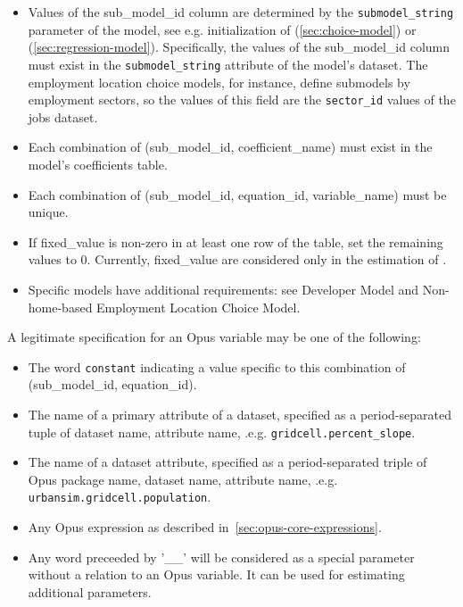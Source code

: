 \begin{itemize} \tight
\item Values of the sub_model_id column are
determined by the \verb|submodel_string| parameter of the model, see e.g. initialization of  
(\ref{sec:choice-model})
or  (\ref{sec:regression-model}). Specifically, the values of the sub_model_id column must 
exist in the \verb|submodel_string| attribute of the model's dataset.
The employment location choice models, for instance, define submodels by
employment sectors, so the values of this field are the
\verb|sector_id| values
of the jobs dataset. 
\item Each combination of (sub_model_id, coefficient_name) \coefficientsindex
must exist in the model's coefficients table.
\item Each combination of (sub_model_id, equation_id, variable_name) \variablesindex must be unique.
\item If fixed_value is non-zero in at least one row of the table, set the remaining values to 0. Currently, fixed_value 
are considered only in the estimation of .
\item Specific models \modelsindex have additional requirements: see Developer Model \modelsindex and Non-home-based Employment Location Choice Model. \modelsindex
\end{itemize}

A legitimate specification for an Opus variable may be one of the following:

\begin{itemize}

\item The word \verb|constant| indicating a value specific to this combination
of (sub_model_id, equation_id).

\item The name of a primary attribute of a dataset, specified as a period-separated
tuple of dataset name, attribute name, .e.g.
\verb|gridcell.percent_slope|.

\item The name of a dataset attribute, specified as a period-separated triple of
Opus package name, dataset name, attribute name, .e.g. \verb|urbansim.gridcell.population|.

\item Any Opus expression as described in~\ref{sec:opus-core-expressions}.
 
\item Any word preceeded by '__' will be considered as a special parameter without a relation to an Opus variable.
It can be used for estimating additional parameters.
\end{itemize}

